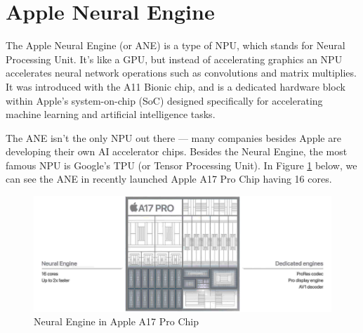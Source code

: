 \documentclass{article}
\begin{document}
\newpage %


\section*{Apple Neural Engine}
The Apple Neural Engine (or ANE) is a type of NPU, which stands for Neural Processing Unit. It's like a GPU, but instead of accelerating graphics an NPU accelerates neural network operations such as convolutions and matrix multiplies\cite{ANEGithub}. It was introduced with the A11 Bionic chip, and is a dedicated hardware block within Apple’s system-on-chip (SoC) designed specifically for accelerating machine learning and artificial intelligence tasks.

The ANE isn't the only NPU out there — many companies besides Apple are developing their own AI accelerator chips. Besides the Neural Engine, the most famous NPU is Google's TPU (or Tensor Processing Unit). In Figure \ref{fig:Apple_A17_Chip2} below, we can see the ANE in recently launched Apple A17 Pro Chip having 16 cores. 


\begin{figure}[H]
	\centering
		\includegraphics[width=1.1\textwidth]{./images/Apple_A17_Chip2.png}
	\caption{Neural Engine in Apple A17 Pro Chip}
	\label{fig:Apple_A17_Chip2}
\end{figure}

\newpage %
\end{document}
